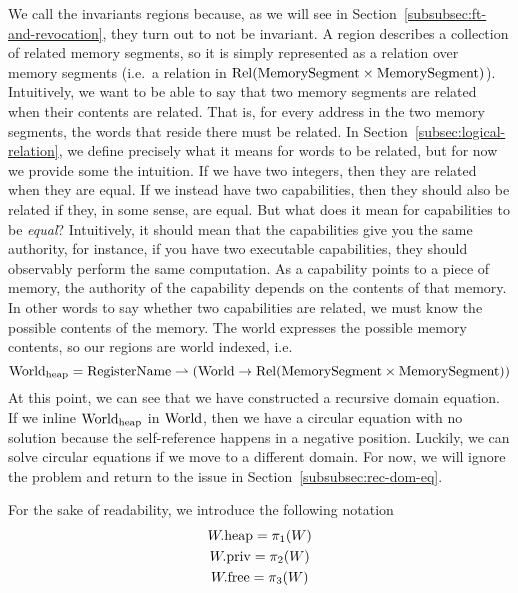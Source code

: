 \begin{jversion}
We call the invariants regions because, as we will see in Section~\ref{subsubsec:ft-and-revocation}, they turn out to not be invariant.
A region describes a collection of related memory segments, so it is simply represented as a relation over memory segments (i.e.\ a relation in $\mathrm{Rel}(\mathrm{MemorySegment} \times \mathrm{MemorySegment})$).
Intuitively, we want to be able to say that two memory segments are related when their contents are related.
That is, for every address in the two memory segments, the words that reside there must be related.
In Section~\ref{subsec:logical-relation}, we define precisely what it means for words to be related, but for now we provide some the intuition.
If we have two integers, then they are related when they are equal.
If we instead have two capabilities, then they should also be related if they, in some sense, are equal.
But what does it mean for capabilities to be \textit{equal}?
Intuitively, it should mean that the capabilities give you the same authority, for instance, if you have two executable capabilities, they should observably perform the same computation.
As a capability points to a piece of memory, the authority of the capability depends on the contents of that memory.
In other words to say whether two capabilities are related, we must know the possible contents of the memory.
The world expresses the possible memory contents, so our regions are world indexed, i.e.
\[
  \mathrm{World}_\mathrm{heap} = \mathrm{RegisterName} \rightharpoonup (\mathrm{World} \rightarrow \mathrm{Rel}(\mathrm{MemorySegment} \times \mathrm{MemorySegment}))
\]
At this point, we can see that we have constructed a recursive domain equation.
If we inline $\mathrm{World}_\mathrm{heap}$ in $\mathrm{World}$, then we have a circular equation with no solution because the self-reference happens in a negative position.
Luckily, we can solve circular equations if we move to a different domain.
For now, we will ignore the problem and return to the issue in Section~\ref{subsubsec:rec-dom-eq}.

For the sake of readability, we introduce the following notation
\begin{gather*}
  W.\mathrm{heap} = \pi_1(W)\\
  W.\mathrm{priv} = \pi_2(W)\\
  W.\mathrm{free} = \pi_3(W)
\end{gather*}

\end{jversion}
